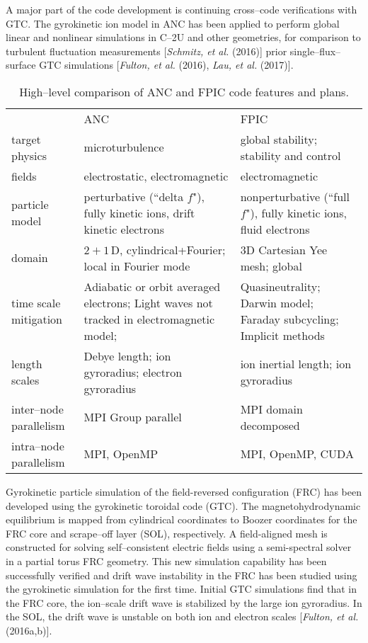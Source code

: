 \documentclass[a4paper,openany,12pt]{book}
\begin{document}
A major part of the code development is continuing cross--code verifications with GTC. The gyrokinetic ion model in ANC has been applied to perform global linear and nonlinear simulations in C--2U and other geometries, for comparison to turbulent fluctuation measurements [\emph{Schmitz, et al.} (2016)] prior single--flux--surface GTC simulations [\emph{Fulton, et al.} (2016), \emph{Lau, et al.} (2017)].
%
\begin{table}[H]
\begin{center}
\caption{High--level comparison of ANC and FPIC code features and plans.}
\begin{tabular}{lp{2.3in}p{2.4in}}\\\hline\hline
&ANC &FPIC\\ 
target physics &microturbulence &global stability; stability and control\\ 
fields &electrostatic, electromagnetic &electromagnetic\\ 
particle model &perturbative (``delta $f$"), fully kinetic ions, drift kinetic electrons 
&nonperturbative (``full $f$"), fully kinetic ions, fluid electrons\\ 
domain &$2+1\,$D, cylindrical+Fourier; local in Fourier mode &3D Cartesian Yee mesh; global\\ 
time scale mitigation &Adiabatic or orbit averaged electrons; Light waves not tracked in electromagnetic model; &Quasineutrality; Darwin model; Faraday subcycling; Implicit methods\\ 
length scales   &Debye length; ion gyroradius; electron gyroradius &ion inertial length; ion gyroradius\\ 
inter--node parallelism  &MPI Group parallel  &MPI domain decomposed\\ 
intra--node parallelism  &MPI, OpenMP  &MPI, OpenMP, CUDA\\ \hline\hline
\end{tabular}
\label{ANC}
\end{center}
\end{table}
%

Gyrokinetic particle simulation of the field-reversed configuration (FRC) has been developed using the gyrokinetic toroidal code (GTC). The magnetohydrodynamic equilibrium is mapped from cylindrical coordinates to Boozer coordinates for the FRC core and scrape--off layer (SOL), respectively. A field-aligned mesh is constructed for solving self--consistent electric fields using a
semi-spectral solver in a partial torus FRC geometry. This new simulation capability has been successfully verified and drift wave instability in the FRC has been studied using the gyrokinetic simulation for the first time. Initial GTC simulations find that in the FRC core, the ion--scale drift wave is
stabilized by the large ion gyroradius. In the SOL, the drift wave is unstable on both ion and electron scales [\emph{Fulton, et al.} (2016a,b)].
\end{document}
